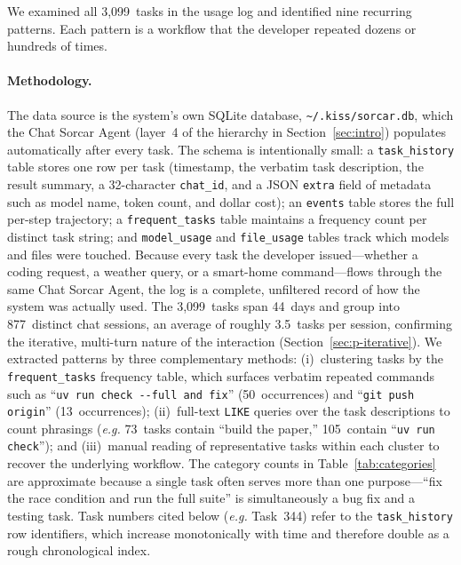 \documentclass{article}
\newcommand{\eg}{\textit{e.g.}}
\begin{document}
We examined all 3,099~tasks in the usage log and identified nine
recurring patterns.
Each pattern is a workflow that the developer repeated dozens or
hundreds of times.

\paragraph{Methodology.}
The data source is the system's own SQLite database,
\texttt{\textasciitilde/.kiss/sorcar.db}, which the Chat Sorcar Agent
(layer~4 of the hierarchy in Section~\ref{sec:intro}) populates
automatically after every task.
The schema is intentionally small: a \texttt{task\_history} table
stores one row per task (timestamp, the verbatim task description,
the result summary, a 32-character \texttt{chat\_id}, and a JSON
\texttt{extra} field of metadata such as model name, token count, and
dollar cost); an \texttt{events} table stores the full per-step
trajectory; a \texttt{frequent\_tasks} table maintains a frequency
count per distinct task string; and \texttt{model\_usage} and
\texttt{file\_usage} tables track which models and files were
touched.
Because every task the developer issued---whether a coding request, a
weather query, or a smart-home command---flows through the same Chat
Sorcar Agent, the log is a complete, unfiltered record of how the
system was actually used.
The 3,099~tasks span 44~days and group into 877~distinct chat
sessions, an average of roughly 3.5~tasks per session, confirming the
iterative, multi-turn nature of the interaction
(Section~\ref{sec:p-iterative}).
We extracted patterns by three complementary methods:
(i)~clustering tasks by the \texttt{frequent\_tasks} frequency table,
which surfaces verbatim repeated commands such as
``\texttt{uv run check -{}-full and fix}'' (50~occurrences) and
``\texttt{git push origin}'' (13~occurrences);
(ii)~full-text \texttt{LIKE} queries over the task descriptions to
count phrasings (\eg{} 73~tasks contain ``build the paper,''
105~contain ``\texttt{uv run check}''); and
(iii)~manual reading of representative tasks within each cluster to
recover the underlying workflow.
The category counts in Table~\ref{tab:categories} are approximate
because a single task often serves more than one purpose---``fix the
race condition and run the full suite'' is simultaneously a bug fix
and a testing task.
Task numbers cited below (\eg{} Task~344) refer to the
\texttt{task\_history} row identifiers, which increase monotonically
with time and therefore double as a rough chronological index.

\end{document}
